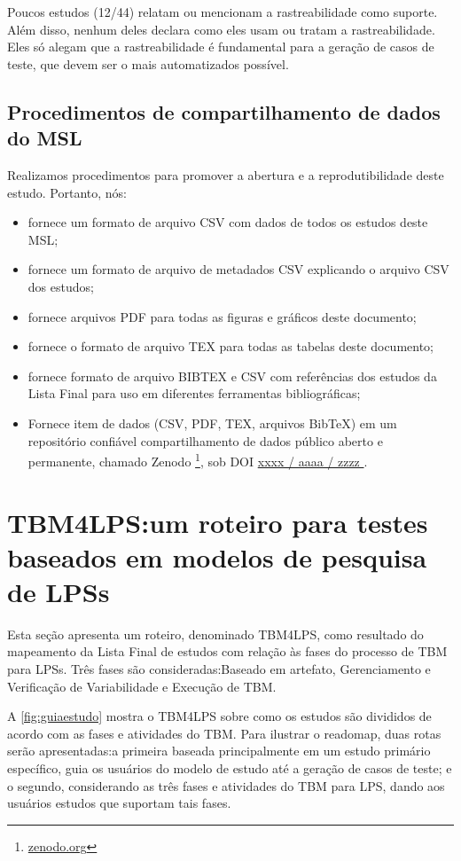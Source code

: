 Poucos estudos (12/44) relatam ou mencionam a rastreabilidade como suporte. Além disso, nenhum deles declara como eles usam ou tratam a rastreabilidade. Eles só alegam que a rastreabilidade é fundamental para a geração de casos de teste, que devem ser o mais automatizados possível.


\subsection{Procedimentos de compartilhamento de dados do MSL}

Realizamos procedimentos para promover a abertura e a reprodutibilidade deste estudo. Portanto, nós:

\begin{itemize}
	\item fornece um formato de arquivo CSV com dados de todos os estudos deste MSL;
	\item fornece um formato de arquivo de metadados CSV explicando o arquivo CSV dos estudos;
	\item fornece arquivos PDF para todas as figuras e gráficos deste documento;
	\item fornece o formato de arquivo TEX para todas as tabelas deste documento;
	\item fornece formato de arquivo BIBTEX e CSV com referências dos estudos da Lista Final para uso em diferentes ferramentas bibliográficas;
	\item Fornece item de dados (CSV, PDF, TEX, arquivos BibTeX) em um repositório confiável compartilhamento de dados público aberto e permanente, chamado Zenodo \footnote{\url{zenodo.org}}, sob DOI \url{xxxx / aaaa / zzzz }.
\end{itemize}

\section{TBM4LPS:um roteiro para testes baseados em modelos de pesquisa de LPSs}
\label{sec:roadmapmslfinal}

Esta seção apresenta um roteiro, denominado TBM4LPS, como resultado do mapeamento da Lista Final de estudos com relação às fases do processo de TBM para LPSs. Três fases são consideradas:Baseado em artefato, Gerenciamento e Verificação de Variabilidade e Execução de TBM.

A  \ref{fig:guiaestudo} mostra o TBM4LPS sobre como os estudos são divididos de acordo com as fases e atividades do TBM. Para ilustrar o readomap, duas rotas serão apresentadas:a primeira baseada principalmente em um estudo primário específico, guia os usuários do modelo de estudo até a geração de casos de teste; e o segundo, considerando as três fases e atividades do TBM para LPS, dando aos usuários estudos que suportam tais fases.

